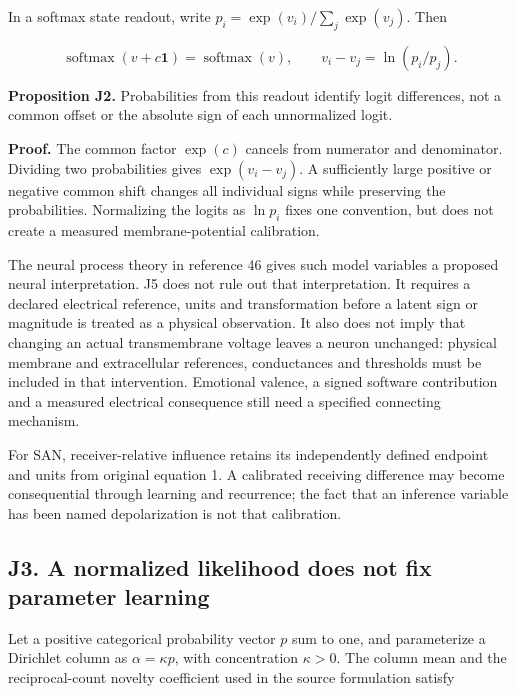 \documentclass[
  american,
  11pt,
  letterpaper,
]{article}
\begin{document}
In a softmax state readout, write \(p_i=\exp(v_i)/\sum_j\exp(v_j)\). Then

\begin{equation}
\operatorname{softmax}(v+c\mathbf1)=\operatorname{softmax}(v),\qquad
v_i-v_j=\ln(p_i/p_j).
\tag{J5}
\end{equation}

\textbf{Proposition J2.} Probabilities from this readout identify logit differences, not a common offset or the absolute sign of each unnormalized logit.

\textbf{Proof.} The common factor \(\exp(c)\) cancels from numerator and denominator. Dividing two probabilities gives \(\exp(v_i-v_j)\). A sufficiently large positive or negative common shift changes all individual signs while preserving the probabilities. Normalizing the logits as \(\ln p_i\) fixes one convention, but does not create a measured membrane-potential calibration.

The neural process theory in reference 46 gives such model variables a proposed neural interpretation. J5 does not rule out that interpretation. It requires a declared electrical reference, units and transformation before a latent sign or magnitude is treated as a physical observation. It also does not imply that changing an actual transmembrane voltage leaves a neuron unchanged: physical membrane and extracellular references, conductances and thresholds must be included in that intervention. Emotional valence, a signed software contribution and a measured electrical consequence still need a specified connecting mechanism.

For SAN, receiver-relative influence retains its independently defined endpoint and units from original equation 1. A calibrated receiving difference may become consequential through learning and recurrence; the fact that an inference variable has been named depolarization is not that calibration.

\subsection{J3. A normalized likelihood does not fix parameter learning}\label{j3.-a-normalized-likelihood-does-not-fix-parameter-learning}

Let a positive categorical probability vector \(p\) sum to one, and parameterize a Dirichlet column as \(\alpha=\kappa p\), with concentration \(\kappa>0\). The column mean and the reciprocal-count novelty coefficient used in the source formulation satisfy
\end{document}
